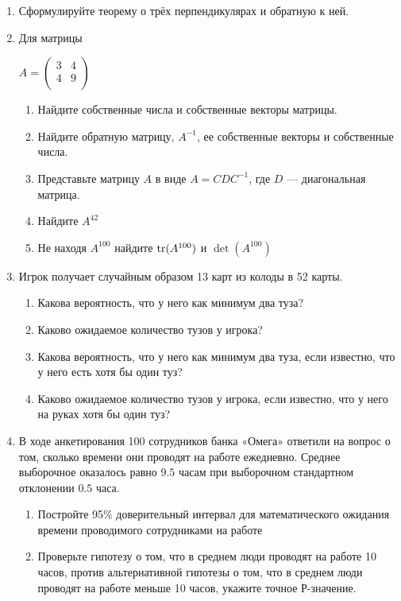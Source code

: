 \documentclass[12pt, a4paper]{article}\usepackage[]{graphicx}\usepackage[]{color}
\begin{document}
\begin{enumerate}
\item Сформулируйте теорему о трёх перпендикулярах и обратную к ней.
\item Для матрицы

$A=\left(%
\begin{array}{cc}
  3 & 4 \\
  4 & 9 \\
\end{array}%
\right)$ \\

\begin{enumerate}
\item Найдите собственные числа и собственные векторы матрицы.
\item Найдите обратную матрицу, $A^{-1}$, ее собственные векторы и собственные числа.
\item Представьте матрицу $A$ в виде $A=CDC^{-1}$, где $D$ — диагональная матрица.
\item Найдите $A^{42}$
\item Не находя $A^{100}$ найдите $\operatorname{tr}(A^{100})$ и $\det(A^{100})$
\end{enumerate}



\item Игрок получает случайным образом 13 карт из колоды в 52 карты.
\begin{enumerate}
\item Какова вероятность, что у него как минимум два туза?
\item Каково ожидаемое количество тузов у игрока?
\item Какова вероятность, что у него как минимум два туза, если
известно, что у него есть хотя бы один туз?
\item Каково ожидаемое количество тузов у игрока, если известно, что у него на руках хотя бы один туз?
\end{enumerate}


\item В ходе анкетирования 100 сотрудников банка «Омега» ответили на вопрос о том, сколько времени они проводят на работе ежедневно. Среднее выборочное оказалось равно $9.5$ часам при выборочном стандартном отклонении $0.5$ часа.
\begin{enumerate}
\item Постройте 95\% доверительный интервал для математического ожидания времени проводимого сотрудниками на работе
\item Проверьте гипотезу о том, что в среднем люди проводят на работе 10 часов, против альтернативной гипотезы о том, что в среднем люди проводят на работе меньше 10 часов, укажите точное Р-значение.
\end{enumerate}

\end{enumerate}
\end{document}
